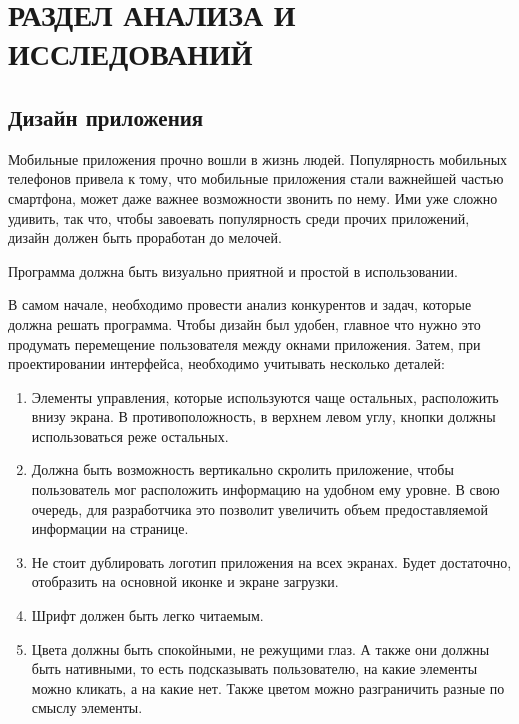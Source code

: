 \graphicspath{{./img}}
\chapter{РАЗДЕЛ АНАЛИЗА И ИССЛЕДОВАНИЙ}
\section{Дизайн приложения}
Мобильные приложения прочно вошли в жизнь людей. Популярность
мобильных телефонов привела к тому, что мобильные приложения стали
важнейшей частью смартфона, может даже важнее возможности звонить по
нему. Ими уже сложно удивить, так что, чтобы завоевать популярность среди
прочих приложений, дизайн должен быть проработан до мелочей.\par
Программа должна быть визуально приятной и простой в
использовании.\par
В самом начале, необходимо провести анализ конкурентов и задач,
которые должна решать программа. Чтобы дизайн был удобен, главное что
нужно это продумать перемещение пользователя между окнами приложения.
Затем, при проектировании интерфейса, необходимо учитывать несколько
деталей:

\begin{enumerate}
	\item Элементы управления, которые используются чаще остальных,
		расположить внизу экрана. В противоположность, в верхнем левом углу,
		кнопки должны использоваться реже остальных.
	\item Должна быть возможность вертикально скролить приложение,
		чтобы пользователь мог расположить информацию на удобном ему уровне.
		В свою очередь, для разработчика это позволит увеличить объем
		предоставляемой информации на странице.
	\item Не стоит дублировать логотип приложения на всех экранах. Будет
		достаточно, отобразить на основной иконке и экране загрузки.
	\item Шрифт должен быть легко читаемым.
	\item Цвета должны быть спокойными, не режущими глаз. А также они
		должны быть нативными, то есть подсказывать пользователю, на какие
		элементы можно кликать, а на какие нет. Также цветом можно
		разграничить разные по смыслу элементы.
\end{enumerate}

